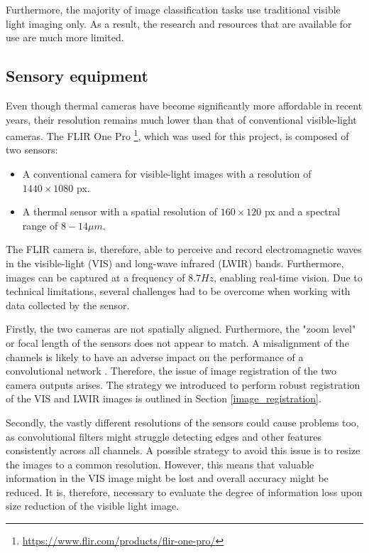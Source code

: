 \documentclass{l4proj}
\begin{document}
Furthermore, the majority of image classification tasks use traditional visible light imaging only. As a result, the research and resources that are available for use are much more limited.

\subsection{Sensory equipment}

Even though thermal cameras have become significantly more affordable in recent years, their resolution remains much lower than that of conventional visible-light cameras. The FLIR One Pro \footnote{\url{https://www.flir.com/products/flir-one-pro/}}, which was used for this project, is composed of two sensors:

\begin{itemize}
  \item A conventional camera for visible-light images with a resolution of $1440 \times 1080$ px.
  \item A thermal sensor with a spatial resolution of $160 \times 120$ px and a spectral range of $8 - 14 \mu m$.
\end{itemize}

The FLIR camera is, therefore, able to perceive and record electromagnetic waves in the visible-light (VIS) and long-wave infrared (LWIR) bands. Furthermore, images can be captured at a frequency of $8.7 Hz$, enabling real-time vision. Due to technical limitations, several challenges had to be overcome when working with data collected by the sensor.

Firstly, the two cameras are not spatially aligned. Furthermore, the "zoom level" or focal length of the sensors does not appear to match. A misalignment of the channels is likely to have an adverse impact on the performance of a convolutional network \citep{chappelow_improving_2008}. Therefore, the issue of image registration of the two camera outputs arises. The strategy we introduced to perform robust registration of the VIS and LWIR images is outlined in Section \ref{image_registration}.

Secondly, the vastly different resolutions of the sensors could cause problems too, as convolutional filters might struggle detecting edges and other features consistently across all channels. A possible strategy to avoid this issue is to resize the images to a common resolution. However, this means that valuable information in the VIS image might be lost and overall accuracy might be reduced. It is, therefore, necessary to evaluate the degree of information loss upon size reduction of the visible light image.
\end{document}
